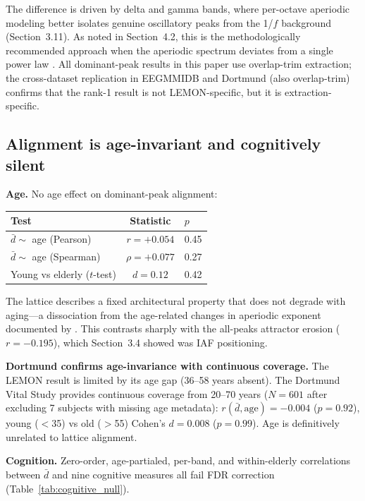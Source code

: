 \documentclass[11pt,a4paper]{article}
\begin{document}
The difference is driven by delta and gamma bands, where per-octave aperiodic modeling better isolates genuine oscillatory peaks from the 1/$f$ background (Section~3.11). As noted in Section~4.2, this is the methodologically recommended approach when the aperiodic spectrum deviates from a single power law \parencite{Donoghue2020}. All dominant-peak results in this paper use overlap-trim extraction; the cross-dataset replication in EEGMMIDB and Dortmund (also overlap-trim) confirms that the rank-1 result is not LEMON-specific, but it is extraction-specific.

\subsection{Alignment is age-invariant and cognitively silent}
\label{sec:cognitive}

\textbf{Age.} No age effect on dominant-peak alignment:

\begin{table}[H]
\centering
\begin{tabular}{lcl}
\toprule
Test & Statistic & $p$ \\
\midrule
$\bar{d} \sim$ age (Pearson) & $r = +0.054$ & 0.45 \\
$\bar{d} \sim$ age (Spearman) & $\rho = +0.077$ & 0.27 \\
Young vs elderly ($t$-test) & $d = 0.12$ & 0.42 \\
\bottomrule
\end{tabular}
\end{table}

\noindent The lattice describes a fixed architectural property that does not degrade with aging---a dissociation from the age-related changes in aperiodic exponent documented by \textcite{Voytek2015}. This contrasts sharply with the all-peaks attractor erosion ($r = -0.195$), which Section~3.4 showed was IAF positioning.

\textbf{Dortmund confirms age-invariance with continuous coverage.} The LEMON result is limited by its age gap (36--58 years absent). The Dortmund Vital Study provides continuous coverage from 20--70 years ($N = 601$ after excluding 7 subjects with missing age metadata): $r(\bar{d}, \text{age}) = -0.004$ ($p = 0.92$), young ($<$35) vs old ($>$55) Cohen's $d = 0.008$ ($p = 0.99$). Age is definitively unrelated to lattice alignment.

\textbf{Cognition.} Zero-order, age-partialed, per-band, and within-elderly correlations between $\bar{d}$ and nine cognitive measures all fail FDR correction (Table~\ref{tab:cognitive_null}).
\end{document}
